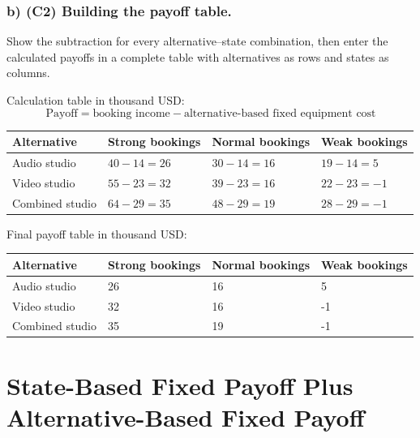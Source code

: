 \subsubsection*{b) \textbf{(C2)} Building the payoff table.}
\label{subsec:problem10-student-media-studio-c2}
Show the subtraction for every alternative--state combination, then enter the calculated payoffs in a complete table with alternatives as rows and states as columns.

Calculation table in thousand USD:
\[
\text{Payoff}=\text{booking income}-\text{alternative-based fixed equipment cost}
\]
\begin{center}
\small
\begin{tabular}{llll}
\toprule
Alternative & Strong bookings & Normal bookings & Weak bookings \\
\midrule
Audio studio & $40 - 14 = 26$ & $30 - 14 = 16$ & $19 - 14 = 5$ \\
Video studio & $55 - 23 = 32$ & $39 - 23 = 16$ & $22 - 23 = -1$ \\
Combined studio & $64 - 29 = 35$ & $48 - 29 = 19$ & $28 - 29 = -1$ \\
\bottomrule
\end{tabular}
\end{center}

Final payoff table in thousand USD:
\begin{center}
\begin{tabular}{llll}
\toprule
Alternative & Strong bookings & Normal bookings & Weak bookings \\
\midrule
Audio studio & 26 & 16 & 5 \\
Video studio & 32 & 16 & -1 \\
Combined studio & 35 & 19 & -1 \\
\bottomrule
\end{tabular}
\end{center}
\section{State-Based Fixed Payoff Plus Alternative-Based Fixed Payoff}
\label{sec:state-based-fixed-payoff-plus-alternative-based-fixed-payoff}
